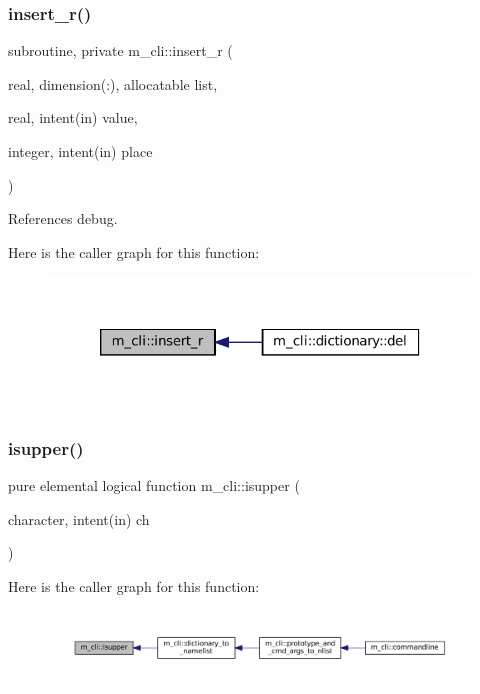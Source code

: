 \subsubsection{\texorpdfstring{insert\+\_\+r()}{insert\_r()}}
{\footnotesize\ttfamily subroutine, private m\+\_\+cli\+::insert\+\_\+r (\begin{DoxyParamCaption}\item[{real, dimension(\+:), allocatable}]{list,  }\item[{real, intent(in)}]{value,  }\item[{integer, intent(in)}]{place }\end{DoxyParamCaption})\hspace{0.3cm}{\ttfamily [private]}}



References debug.

Here is the caller graph for this function\+:\nopagebreak
\begin{figure}[H]
\begin{center}
\leavevmode
\includegraphics[width=320pt]{namespacem__cli_a4bfb90e14824f94017b1d4fcb39f0701_icgraph}
\end{center}
\end{figure}
\mbox{\label{namespacem__cli_a4c126288dc18289b2095a0882f10ca77}} 
\subsubsection{\texorpdfstring{isupper()}{isupper()}}
{\footnotesize\ttfamily pure elemental logical function m\+\_\+cli\+::isupper (\begin{DoxyParamCaption}\item[{character, intent(in)}]{ch }\end{DoxyParamCaption})\hspace{0.3cm}{\ttfamily [private]}}

Here is the caller graph for this function\+:\nopagebreak
\begin{figure}[H]
\begin{center}
\leavevmode
\includegraphics[width=350pt]{namespacem__cli_a4c126288dc18289b2095a0882f10ca77_icgraph}
\end{center}
\end{figure}
\mbox{\label{namespacem__cli_ade3d1e36f0fc6a47b5469dcd8ade5312}} 
